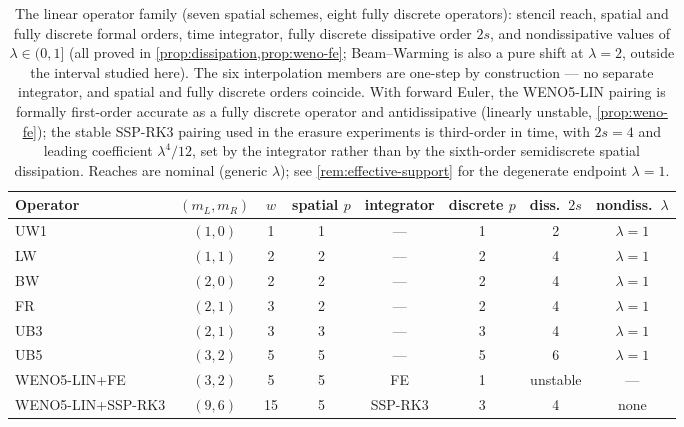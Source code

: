 \documentclass[pdflatex,sn-mathphys-num]{sn-jnl}%
\theoremstyle{thmstyleone}%
\theoremstyle{thmstyletwo}%
\theoremstyle{thmstylethree}%
\begin{document}
\begin{table}[htbp]
\centering
\caption{The linear operator family (seven spatial schemes, eight fully discrete operators): stencil reach, spatial and fully discrete formal orders, time integrator, fully discrete dissipative order $2s$, and nondissipative values of $\lambda\in(0,1]$ (all proved in \cref{prop:dissipation,prop:weno-fe}; Beam--Warming is also a pure shift at $\lambda=2$, outside the interval studied here).
The six interpolation members are one-step by construction --- no separate integrator, and spatial and fully discrete orders coincide.
With forward Euler, the WENO5-LIN pairing is formally first-order accurate as a fully discrete operator and antidissipative (linearly unstable, \cref{prop:weno-fe}); the stable SSP-RK3 pairing used in the erasure experiments is third-order in time, with $2s=4$ and leading coefficient $\lambda^4/12$, set by the integrator rather than by the sixth-order semidiscrete spatial dissipation.
Reaches are nominal (generic $\lambda$); see \cref{rem:effective-support} for the degenerate endpoint $\lambda=1$.}
\label{tab:scheme-zoo}
\begin{tabular}{@{}lccccccc@{}}
\toprule
Operator          & $(m_L,m_R)$ & $w$ & spatial $p$ & integrator & discrete $p$ & diss.\ $2s$ & nondiss.\ $\lambda$ \\
\midrule
UW1               & $(1,0)$     & 1   & 1           & ---        & 1            & 2           & $\lambda=1$         \\
LW                & $(1,1)$     & 2   & 2           & ---        & 2            & 4           & $\lambda=1$         \\
BW                & $(2,0)$     & 2   & 2           & ---        & 2            & 4           & $\lambda=1$         \\
FR                & $(2,1)$     & 3   & 2           & ---        & 2            & 4           & $\lambda=1$         \\
UB3               & $(2,1)$     & 3   & 3           & ---        & 3            & 4           & $\lambda=1$         \\
UB5               & $(3,2)$     & 5   & 5           & ---        & 5            & 6           & $\lambda=1$         \\
WENO5-LIN+FE      & $(3,2)$     & 5   & 5           & FE         & 1            & unstable    & ---                 \\
WENO5-LIN+SSP-RK3 & $(9,6)$     & 15  & 5           & SSP-RK3    & 3            & 4           & none                \\
\bottomrule
\end{tabular}
\end{table}
\end{document}

